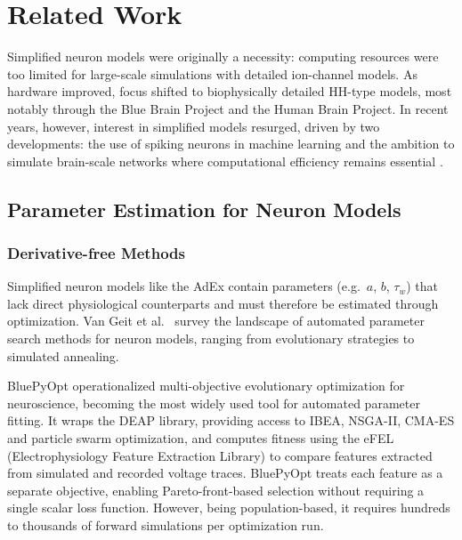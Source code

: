 \chapter{Related Work}\label{ch:relwork}

Simplified neuron models were originally a necessity: computing resources were too limited for large-scale simulations with detailed ion-channel models.
As hardware improved, focus shifted to biophysically detailed \gls{HH}-type models, most notably through the Blue Brain Project \cite{VanGeit2016} and the Human Brain Project\cite{Amunts2016}.
In recent years, however, interest in simplified models resurged, driven by two developments: the use of spiking neurons in machine learning \cite{Neftci2019} and the ambition to simulate brain-scale networks where computational efficiency remains essential \cite{Tesler2024}.

\section{Parameter Estimation for Neuron Models}\label{sec:rw:param-estimation}

\subsection{Derivative-free Methods}
Simplified neuron models like the \gls{AdEx} contain parameters (e.g.\ $a$, $b$, $\tau_w$) that lack direct physiological counterparts and must therefore be estimated through optimization.
Van Geit et al.\ \cite{VanGeit2008} survey the landscape of automated parameter search methods for neuron models, ranging from evolutionary strategies to simulated annealing.

BluePyOpt \cite{VanGeit2016} operationalized multi-objective evolutionary optimization for neuroscience, becoming the most widely used tool for automated parameter fitting.
It wraps the DEAP library, providing access to IBEA, NSGA-II, CMA-ES and particle swarm optimization, and computes fitness using the eFEL (Electrophysiology Feature Extraction Library) to compare features extracted from simulated and recorded voltage traces.
BluePyOpt treats each feature as a separate objective, enabling Pareto-front-based selection without requiring a single scalar loss function.
However, being population-based, it requires hundreds to thousands of forward simulations per optimization run.

